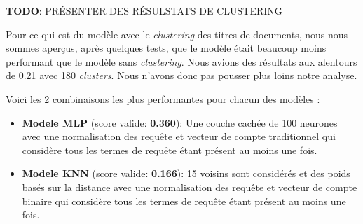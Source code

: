 \textbf{TODO}: PRÉSENTER DES RÉSULSTATS DE CLUSTERING

Pour ce qui est du modèle avec le \textit{clustering} des titres de documents, nous nous sommes aperçus, après quelques tests, que le modèle était beaucoup moins performant que le modèle sans \textit{clustering}. Nous avions des résultats aux alentours de 0.21 avec 180 \textit{clusters}. Nous n'avons donc pas pousser plus loins notre analyse.

Voici les 2 combinaisons les plus performantes pour chacun des modèles :

\begin{itemize}
  \item \textbf{Modele MLP} (score valide: \textbf{0.360}): Une couche cachée de 100 neurones avec une normalisation des requête et vecteur de compte traditionnel qui considère tous les termes de requête étant présent au moins une fois.
  \item \textbf{Modele KNN} (score valide: \textbf{0.166}): 15 voisins sont considérés et des poids basés sur la distance avec une normalisation des requête et vecteur de compte binaire qui considère tous les termes de requête étant présent au moins une fois.
\end{itemize}




